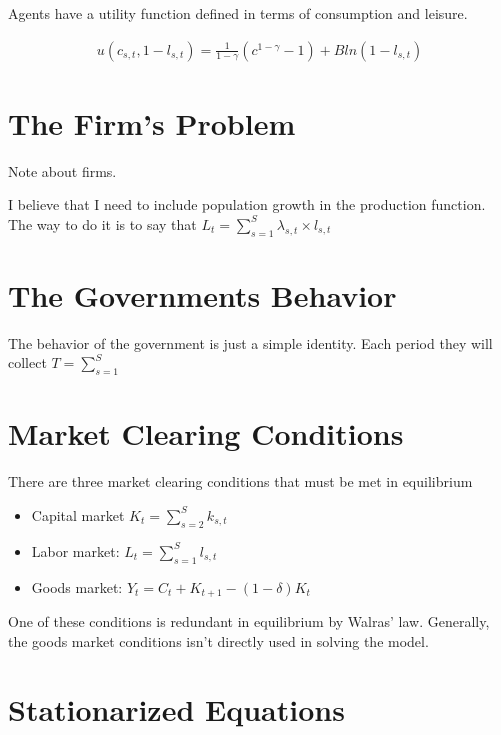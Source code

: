 \documentclass[paper=a4, fontsize=11pt]{scrartcl} %
\numberwithin{figure}{section} %
\numberwithin{table}{section} %
\begin{document}
		Agents have a utility function defined in terms of consumption and leisure.

		\begin{align}
			u(c_{s, t}, 1 - l_{s, t}) = \frac{1}{1 - \gamma}(c^{1 -\gamma} - 1) + B ln(1 - l_{s,t})
		\end{align}


\section{The Firm's Problem}

Note about firms.

I believe that I need to include population growth in the production function. The way to do it is to say that $L_t = \sum_{s=1} ^ S \lambda_{s, t} \times l_{s, t}$

\section{The Governments Behavior}

The behavior of the government is just a simple identity. Each period they will collect $T = \sum_{s=1}^S $

\section{Market Clearing Conditions}
	There are three market clearing conditions that must be met in equilibrium

	\begin{itemize}
		\item Capital market $K_t = \sum_{s=2}^S k_{s, t}$
		\item Labor market: $L_t = \sum_{s = 1} ^S l_{s, t}$
		\item Goods market: $Y_t = C_t + K_{t+1} - (1 - \delta)K_t$
	\end{itemize}

	One of these conditions is redundant in equilibrium by Walras' law. Generally, the goods market conditions isn't directly used in solving the model.

\section{Stationarized Equations}
\end{document}

